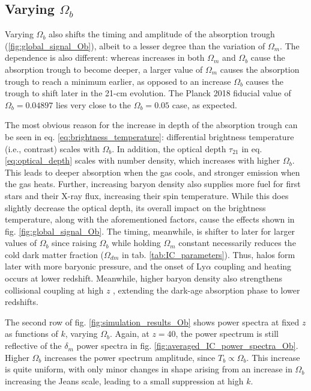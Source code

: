 \documentclass[floats,floatfix,showpacs,amssymb,prd,superscriptaddress,nofootinbib]{revtex4-2} %
\begin{document}
\subsection{Varying $\Omega_b$}

Varying $\Omega_b$ also shifts the timing and amplitude of the absorption trough (\ref{fig:global_signal_Ob}), albeit to a lesser degree than the variation of $\Omega_m$. The dependence is also different: whereas increases in both $\Omega_m$ and $\Omega_b$ cause the absorption trough to become deeper, a larger value of $\Omega_m$ causes the absorption trough to reach a minimum earlier, as opposed to an increase $\Omega_b$ causes the trough to shift later in the 21-cm evolution. The Planck 2018 fiducial value of $\Omega_b = 0.04897$ lies very close to the $\Omega_b = 0.05$ case, as expected.

The most obvious reason for the increase in depth of the absorption trough can be seen in eq. \ref{eq:brightness_temperature}: differential brightness temperature (i.e., contrast) scales with $\Omega_b$. In addition, the optical depth $\tau_{21}$ in eq. \ref{eq:optical_depth} scales with number density, which increases with higher $\Omega_b$. This leads to deeper absorption when the gas cools, and stronger emission when the gas heats. Further, increasing baryon density also supplies more fuel for first stars and their X-ray flux, increasing their spin temperature. While this does slightly decrease the optical depth, its overall impact on the brightness temperature, along with the aforementioned factors, cause the effects shown in fig. \ref{fig:global_signal_Ob}. The timing, meanwhile, is shifter to later for larger values of $\Omega_b$ since raising $\Omega_b$ while holding $\Omega_m$ constant necessarily reduces the cold dark matter fraction ($\Omega_{dm}$ in tab. \ref{tab:IC_parameters}). Thus, halos form later with more baryonic pressure, and the onset of Ly$\alpha$ coupling and heating occurs at lower redshift. Meanwhile, higher baryon density also strengthens collisional coupling at high $z$ , extending the dark-age absorption phase to lower redshifts. 

The second row of fig. \ref{fig:simulation_results_Ob} shows power spectra at fixed $z$ as functions of $k$, varying $\Omega_b$. Again, at $z = 40$, the power spectrum is still reflective of the $\delta_m$ power spectra in fig. \ref{fig:averaged_IC_power_spectra_Ob}. Higher $\Omega_b$ increases the power spectrum amplitude, since $T_b \propto \Omega_b$.  This increase is quite uniform, with only minor changes in shape arising from an increase in $\Omega_b$ increasing the Jeans scale, leading to a small suppression at high $k$. 
\end{document}
